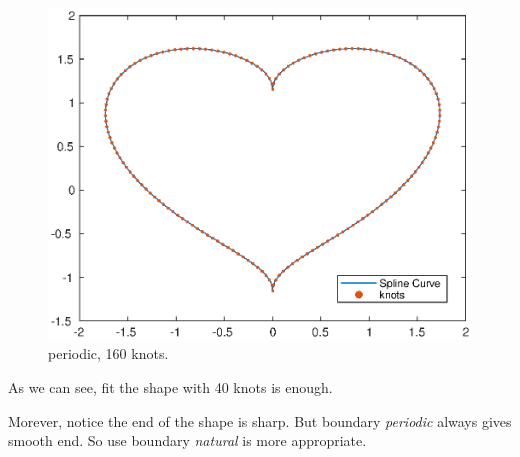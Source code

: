 \documentclass[11pt,en]{elegantpaper}
\begin{document}
\begin{figure}[htbp]
\begin{minipage}[t]{0.33\linewidth}
        \includegraphics[width=0.95\linewidth]{figure/assE_160knots_periodic.eps}
        \caption{periodic, 160 knots.}
        \label{fig:side:c}
    \end{minipage}%
\end{figure}

As we can see, fit the shape with 40 knots is enough.

Morever, notice the end of the shape is sharp. But boundary \textit{periodic} always gives smooth end. So use boundary \textit{natural} is more appropriate.
\end{document}

